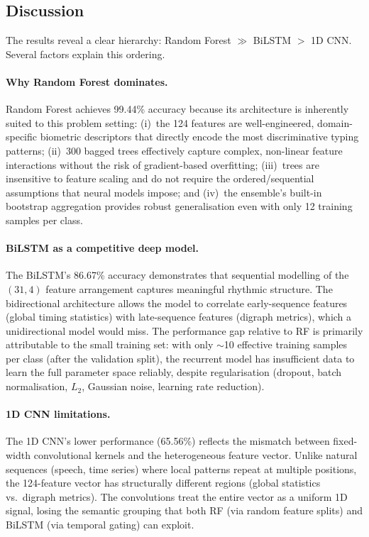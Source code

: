 \subsection{Discussion}

The results reveal a clear hierarchy: Random Forest $\gg$ BiLSTM $>$ 1D CNN. Several factors explain this ordering.

\paragraph{Why Random Forest dominates.}
Random Forest achieves 99.44\% accuracy because its architecture is inherently suited to this problem setting: (i)~the 124 features are well-engineered, domain-specific biometric descriptors that directly encode the most discriminative typing patterns; (ii)~300 bagged trees effectively capture complex, non-linear feature interactions without the risk of gradient-based overfitting; (iii)~trees are insensitive to feature scaling and do not require the ordered/sequential assumptions that neural models impose; and (iv)~the ensemble's built-in bootstrap aggregation provides robust generalisation even with only 12 training samples per class.

\paragraph{BiLSTM as a competitive deep model.}
The BiLSTM's 86.67\% accuracy demonstrates that sequential modelling of the $(31,4)$ feature arrangement captures meaningful rhythmic structure. The bidirectional architecture allows the model to correlate early-sequence features (global timing statistics) with late-sequence features (digraph metrics), which a unidirectional model would miss. The performance gap relative to RF is primarily attributable to the small training set: with only $\sim$10 effective training samples per class (after the validation split), the recurrent model has insufficient data to learn the full parameter space reliably, despite regularisation (dropout, batch normalisation, $L_2$, Gaussian noise, learning rate reduction).

\paragraph{1D CNN limitations.}
The 1D CNN's lower performance (65.56\%) reflects the mismatch between fixed-width convolutional kernels and the heterogeneous feature vector. Unlike natural sequences (speech, time series) where local patterns repeat at multiple positions, the 124-feature vector has structurally different regions (global statistics vs.\ digraph metrics). The convolutions treat the entire vector as a uniform 1D signal, losing the semantic grouping that both RF (via random feature splits) and BiLSTM (via temporal gating) can exploit.

